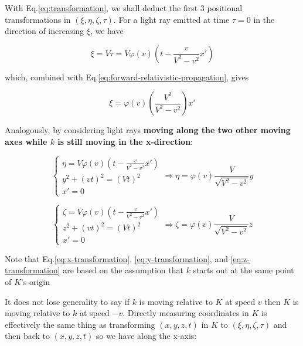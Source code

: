 With Eq.\ref{eq:transformation}, we shall deduct the first 3 positional transformations in $(\xi, \eta, \zeta, \tau)$.
For a light ray emitted at time $\tau = 0$ in the direction of increasing $\xi$, we have

\begin{equation}
    \xi = V\tau = V\varphi(v)\left( t - \frac{v}{V^2 - v^2} x' \right)
\end{equation}

which, combined with Eq.\ref{eq:forward-relativistic-propagation}, gives

\begin{equation}\label{eq:x-transformation}
    \xi = \varphi(v)\left( \frac{V^2}{V^2 - v^2} \right) x'
\end{equation}

Analogously, by considering light rays \textbf{moving along the two other moving axes while $k$ is still moving in the
x-direction}:

\begin{equation}\label{eq:y-transformation}
    \left\{
    \begin{array}{l}
        \eta = V\varphi(v)\left( t - \frac{v}{V^2 - v^2} x' \right) \\
        y^2 + (vt)^2 = (Vt)^2 \\
        x' = 0
    \end{array}
    \right.
    \Rightarrow
    \eta = \varphi(v)\frac{V}{\sqrt{V^2 - v^2}}y
\end{equation}

\begin{equation}\label{eq:z-transformation}
    \left\{
    \begin{array}{l}
        \zeta = V\varphi(v)\left( t - \frac{v}{V^2 - v^2} x' \right) \\
        z^2 + (vt)^2 = (Vt)^2 \\
        x' = 0
    \end{array}
    \right.
    \Rightarrow
    \zeta = \varphi(v)\frac{V}{\sqrt{V^2 - v^2}}z
\end{equation}

Note that Eq.\ref{eq:x-transformation}, \ref{eq:y-transformation}, and \ref{eq:z-transformation} are based on the
assumption that $k$ starts out at the same point of $K$'s origin

It does not lose generality to say if $k$ is moving relative to $K$ at speed $v$ then $K$ is moving relative to $k$ at
speed $-v$. Directly measuring coordinates in $K$ is effectively the same thing as transforming $(x, y, z, t)$ in $K$
to $(\xi, \eta, \zeta, \tau)$ and then back to $(x, y, z, t)$ so we have along the x-axis:

